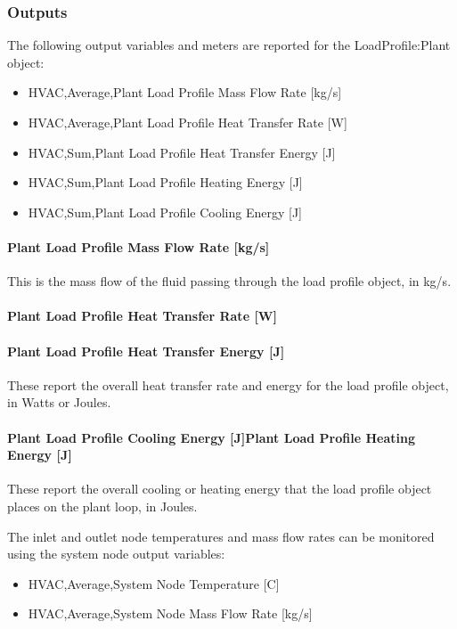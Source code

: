 \subsubsection{Outputs}\label{outputs-020}

The following output variables and meters are reported for the LoadProfile:Plant object:

\begin{itemize}
\item
  HVAC,Average,Plant Load Profile Mass Flow Rate {[}kg/s{]}
\item
  HVAC,Average,Plant Load Profile Heat Transfer Rate {[}W{]}
\item
  HVAC,Sum,Plant Load Profile Heat Transfer Energy {[}J{]}
\item
  HVAC,Sum,Plant Load Profile Heating Energy {[}J{]}
\item
  HVAC,Sum,Plant Load Profile Cooling Energy {[}J{]}
\end{itemize}

\paragraph{Plant Load Profile Mass Flow Rate {[}kg/s{]}}\label{plant-load-profile-mass-flow-rate-kgs}

This is the mass flow of the fluid passing through the load profile object, in kg/s.

\paragraph{Plant Load Profile Heat Transfer Rate {[}W{]}}\label{plant-load-profile-heat-transfer-rate-w}

\paragraph{Plant Load Profile Heat Transfer Energy {[}J{]}}\label{plant-load-profile-heat-transfer-energy-j}

These report the overall heat transfer rate and energy for the load profile object, in Watts or Joules.

\paragraph{Plant Load Profile Cooling Energy {[}J{]}Plant Load Profile Heating Energy {[}J{]}}\label{plant-load-profile-cooling-energy-jplant-load-profile-heating-energy-j}

These report the overall cooling or heating energy that the load profile object places on the plant loop, in Joules.

The inlet and outlet node temperatures and mass flow rates can be monitored using the system node output variables:

\begin{itemize}
\item
  HVAC,Average,System Node Temperature {[}C{]}
\item
  HVAC,Average,System Node Mass Flow Rate {[}kg/s{]}
\end{itemize}
